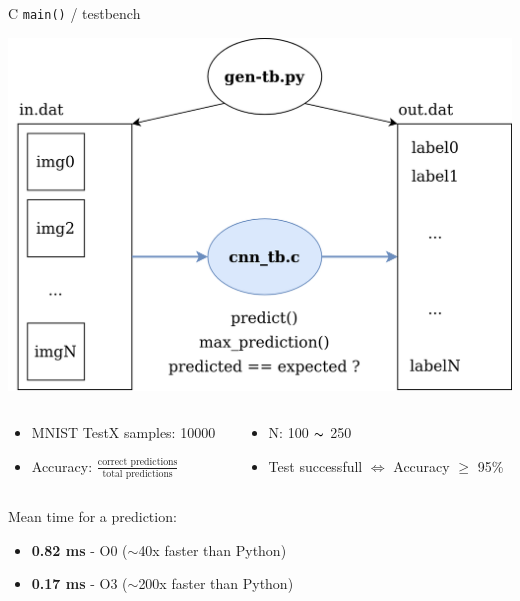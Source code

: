 \documentclass[10pt, xcolor=dvipsnames, compress]{beamer}
\begin{document}
\begin{frame}{C \texttt{main()} / testbench}

    \begin{center}
        \includegraphics[width=.4\textwidth]{tb.png}
    \end{center}

    \vspace{.5em}

    \begin{columns}[T]
        \begin{column}{.5\textwidth}
            \begin{itemize}
            \item MNIST TestX samples: 10000\\
            \item Accuracy: $\frac{\text{correct predictions}}{\text{total predictions}}$
            \end{itemize}


        \end{column}
        \begin{column}{.5\textwidth}
            \begin{itemize}{}
                \item[]\hspace{-2em} N: 100 $\thicksim$ 250\\
                \item[]\hspace{-2em} Test successfull $\Leftrightarrow$ Accuracy $\ge$ 95\%
            \end{itemize}

        \end{column}
    \end{columns}
    \vspace{1.5em}

    Mean time for a prediction:
    \begin{itemize}
        \item \textbf{0.82 ms} - O0 ($\sim$40x faster than Python)
        \item \textbf{0.17 ms} - O3 ($\sim$200x faster than Python)
    \end{itemize}

\end{frame}
\end{document}
